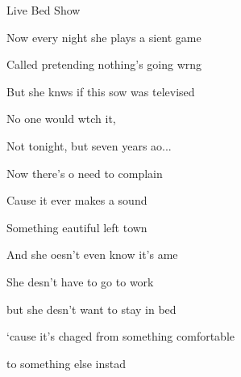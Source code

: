 \begin{song}{Live Bed Show}
 \begin{songchorus}     
	\hspace{20pt} Now every night she plays a sient game 
		
	\hspace{20pt} Called pretending nothing's going wrng
	
	
	But she knws if this sow was televised
	
	
	No one would wtch it, 
	
	Not tonight, but seven years ao...		
	
\end{songchorus}
 
\begin{songchorus}     
	\hspace{20pt}\hspace{20pt}\hspace{20pt}\hspace{20pt}\hspace{20pt}
	
	Now there's o need to complain 
	
	Cause it ever makes a sound
	
	Something eautiful left town 
	
	And she oesn't even know it's ame
\end{songchorus}

\begin{songverse*}[Outro]
	She desn't have to go to work
	
	but she desn't want to stay in bed
	
	`cause it's chaged from something comfortable
	
	to something else instad
\end{songverse*}

\end{song}